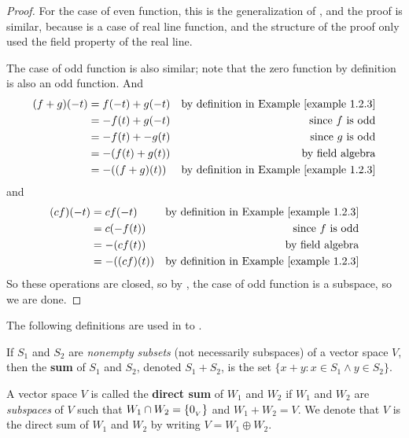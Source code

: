 \begin{proof}
For the case of even function, this is the generalization of , and the proof is similar,
because  is a case of real line function, and the structure of the proof only used the field property of the real line.

The case of odd function is also similar;
note that the zero function by definition is also an odd function.
And
\begin{align*}
    (f + g)(-t) & = f(-t) + g(-t) & \text{by definition in \EXAMPLE{1.2.3}} \\
                & = -f(t) + g(-t) & \text{since \(f\) is odd} \\
                & = -f(t) + -g(t) & \text{since \(g\) is odd} \\
                & = -(f(t) + g(t)) & \text{by field algebra} \\
                & = -((f + g)(t)) & \text{by definition in \EXAMPLE{1.2.3}}
\end{align*}
and
\begin{align*}
    (cf)(-t) & = cf(-t) & \text{by definition in \EXAMPLE{1.2.3}} \\
                & = c(-f(t)) & \text{since \(f\) is odd} \\
                & = -(cf(t)) & \text{by field algebra} \\
                & = -((cf)(t)) & \text{by definition in \EXAMPLE{1.2.3}}
\end{align*}
So these operations are closed, so by , the case of odd function is a subspace, so we are done.
\end{proof}

The following definitions are used in  to .

\begin{additional definition} \label{adef 1.8}
If \(S_1\) and \(S_2\) are \emph{nonempty} \emph{subsets} (not necessarily subspaces) of a vector space \(V\), then the \textbf{sum} of \(S_1\) and \(S_2\), denoted \(S_1 + S_2\), is the set \( \{ x + y : x \in S_1 \land y \in S_2 \} \).
\end{additional definition}

\begin{additional definition} \label{adef 1.9}
A vector space \(V\) is called the \textbf{direct sum} of \(W_1\) and \(W_2\) if \(W_1\) and \(W_2\) are \emph{subspaces} of \(V\) such that \(W_1 \cap W_2 = \{0_{_V}\}\) and \(W_1 + W_2 = V\).
We denote that \(V\) is the direct sum of \(W_1\) and \(W_2\) by writing \(V = W_1 \oplus W_2\).
\end{additional definition}

